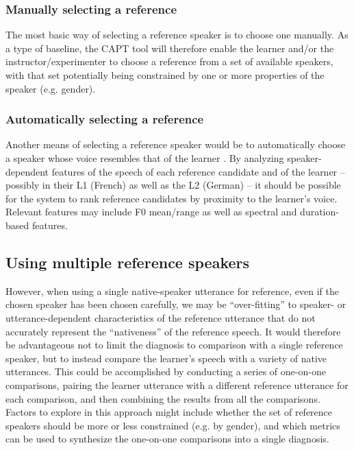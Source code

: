 		\subsubsection{Manually selecting a reference}
		\label{sec:compare:single:manual}
		
		The most basic way of selecting a reference speaker is to choose one manually.
As a type of baseline, the CAPT tool will therefore enable the learner and/or the instructor/experimenter to choose a reference from a set of available speakers, with that set potentially being constrained by one or more properties of the speaker (e.g. gender). 
	
		\subsubsection{Automatically selecting a reference}
		\label{sec:compare:single:auto}
		
		Another means of selecting a reference speaker would be to automatically choose a speaker whose voice resembles
that of the learner \citep{Probst2002}. By analyzing speaker-dependent features of the speech of each reference candidate and of the learner -- possibly in their L1 (French) as well as the L2 (German) -- it should be possible for the system to rank reference candidates by proximity to the learner's voice. Relevant features may include F0 mean/range as well as spectral and duration-based features.
	
	\subsection{Using multiple reference speakers}
	\label{sec:compare:multi}
	
	However, when using a single native-speaker utterance for reference, even if the chosen speaker has been chosen carefully, we may be ``over-fitting'' to speaker- or utterance-dependent characteristics of the reference utterance that do not accurately represent the ``nativeness'' of the reference speech. It would therefore be advantageous not to limit the diagnosis to comparison with a single reference speaker, but to instead compare the learner's speech with a variety of native utterances. This could be accomplished by conducting a series of one-on-one comparisons, pairing the learner utterance with a different reference utterance for each comparison, and then combining the results from all the comparisons.  Factors to explore in this approach might include whether the set of reference speakers should be more or less constrained (e.g. by gender), and which metrics can be used to synthesize the one-on-one comparisons into a single diagnosis.
	
